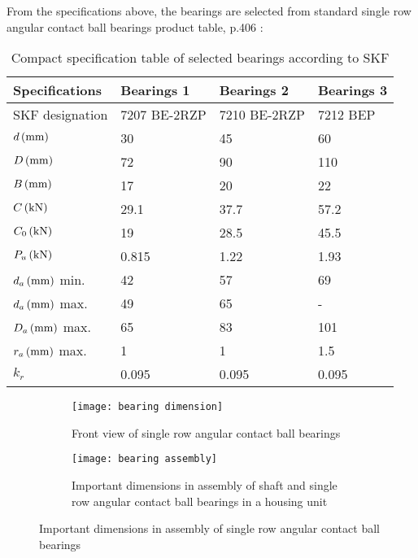 From the specifications above, the bearings are selected from standard single row angular contact ball bearings product table, p.406 \cite{rolling_bearings}:
\begin{table}[ht]
	\centering
	\caption{Compact specification table of selected bearings according to SKF \cite{rolling_bearings}}
	\begin{tabular}{llll}\toprule
		Specifications & Bearings 1 & Bearings 2 & Bearings 3 \\ \midrule
		SKF designation & 7207 BE-2RZP & 7210 BE-2RZP & 7212 BEP\\
		$ d \, (\mathrm{mm}) $ & 30 & 45 & 60\\
		$ D \, (\mathrm{mm}) $ & 72 & 90 & 110\\
		$ B \, (\mathrm{mm}) $ & 17 & 20 & 22\\
		$ C \, (\mathrm{kN}) $ & 29.1 & 37.7 & 57.2\\
		$ C_0 \, (\mathrm{kN}) $ & 19 & 28.5 & 45.5\\
		$ P_u \, (\mathrm{kN}) $ & 0.815 & 1.22 & 1.93\\
		$ d_a \, (\mathrm{mm}) $ min. & 42 & 57 & 69\\
		$ d_a \, (\mathrm{mm}) $ max. & 49 & 65 & -\\
		$ D_a \, (\mathrm{mm}) $ max. & 65 & 83 & 101\\
		$ r_a \, (\mathrm{mm}) $ max. & 1 & 1 & 1.5\\
		$ k_r $ & 0.095 & 0.095 & 0.095\\
		\bottomrule
	\end{tabular}
	\label{bearingspecs}
\end{table}

\begin{figure}[ht]
	\centering
	\begin{subfigure}{.4\linewidth}
		\centering
		\texttt{[image: bearing dimension]}
		\caption{Front view of single row angular contact ball bearings}
		\label{bearingdim}
	\end{subfigure}\hspace*{0.1\linewidth}
	\begin{subfigure}{.4\linewidth}
		\centering
		\texttt{[image: bearing assembly]}
		\caption{Important dimensions in assembly of shaft and single row angular contact ball bearings in a housing unit}
		\label{bearingass}
	\end{subfigure}
	\caption{Important dimensions in assembly of single row angular contact ball bearings \cite{rolling_bearings}}
	\label{bearingdimass}
\end{figure}


